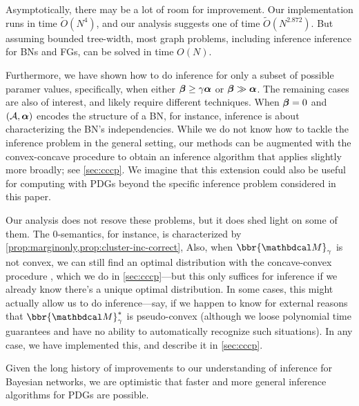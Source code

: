 Asymptotically, there may be a lot of room for improvement.
Our implementation runs in time $\tilde O(N^4)$, and our analysis suggests one of time $\tilde O(N^{2.872})$. 
But assuming bounded tree-width, most graph problems, including
inference inference for BNs and FGs, can be solved in time $O(N)$. 


Furthermore, we have shown how to do inference for only a subset of
possible paramer values, specifically, 
when
either $\boldsymbol\beta \ge \gamma \boldsymbol\alpha$ or $\boldsymbol\beta \gg \boldsymbol\alpha$. 
The remaining cases are also of interest, and likely require different techniques. 
When $\boldsymbol\beta = 0$ and $(\mathcal A, \boldsymbol\alpha)$ encodes the structure of a BN,
    for instance,
    inference is about characterizing the BN's independencies.
While we do not know how to tackle 
the inference problem in the general setting, 
our methods can be augmented with the convex-concave procedure 
    \parencite{yuille2003concave} to obtain an inference
    algorithm that applies slightly more broadly; see \cref{sec:cccp}.
We imagine that this extension could also be useful for computing with PDGs 
    beyond the specific inference problem considered in this paper.

Our analysis does not resove these problems, but it
    does shed light on some of them.  
The $0$-semantics, for instance, is 
characterized by \cref{prop:marginonly,prop:cluster-inc-correct}, 
Also, when $\bbr{\dg M}_\gamma$ is not convex, we can still find an optimal distribution with the concave-convex procedure \cite{yuille2003concave}, which we do in \cref{sec:cccp}---but this only suffices for inference if we already know there's a unique optimal distribution.
In some cases, this might actually allow us to do inference---say, if we happen to know for external reasons that $\bbr{\dg M}^*_\gamma$ is pseudo-convex (although we loose polynomial time guarantees and have no ability to automatically recognize such situations). In any case, we have implemented this, and describe it in \cref{sec:cccp}.


Given the long history of improvements to our
understanding of inference for 
    Bayesian networks,
we are optimistic that 
    faster and more general
    inference algorithms
    for PDGs
    are possible.



